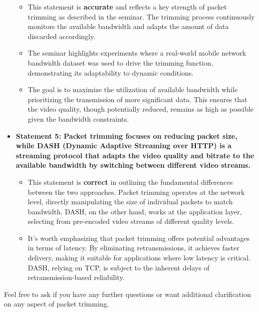 \documentclass[
]{article}
\begin{document}
\begin{itemize}
  \begin{itemize}
  
  \item
    This statement is \textbf{accurate} and reflects a key strength of
    packet trimming as described in the seminar. The trimming process
    continuously monitors the available bandwidth and adapts the amount
    of data discarded accordingly.
  \item
    The seminar highlights experiments where a real-world mobile network
    bandwidth dataset was used to drive the trimming function,
    demonstrating its adaptability to dynamic conditions.
  \item
    The goal is to maximize the utilization of available bandwidth while
    prioritizing the transmission of more significant data. This ensures
    that the video quality, though potentially reduced, remains as high
    as possible given the bandwidth constraints.
  \end{itemize}
\item
  \textbf{Statement 5: Packet trimming focuses on reducing packet size,
  while DASH (Dynamic Adaptive Streaming over HTTP) is a streaming
  protocol that adapts the video quality and bitrate to the available
  bandwidth by switching between different video streams.}

  \begin{itemize}
  
  \item
    This statement is \textbf{correct} in outlining the fundamental
    differences between the two approaches. Packet trimming operates at
    the network level, directly manipulating the size of individual
    packets to match bandwidth. DASH, on the other hand, works at the
    application layer, selecting from pre-encoded video streams of
    different quality levels.
  \item
    It's worth emphasizing that packet trimming offers potential
    advantages in terms of latency. By eliminating retransmissions, it
    achieves faster delivery, making it suitable for applications where
    low latency is critical. DASH, relying on TCP, is subject to the
    inherent delays of retransmission-based reliability.
  \end{itemize}
\end{itemize}

Feel free to ask if you have any further questions or want additional
clarification on any aspect of packet trimming.
\end{document}
